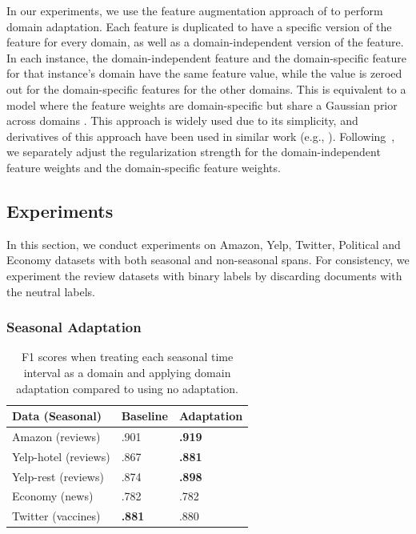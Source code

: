 In our experiments, we use the feature augmentation approach of \cite{daume2007frustratingly} to perform domain adaptation. Each feature is duplicated to have a specific version of the feature for every domain, as well as a domain-independent version of the feature. In each instance, the domain-independent feature and the domain-specific feature for that instance's domain have the same feature value, while the value is zeroed out for the domain-specific features for the other domains. This is equivalent to a model where the feature weights are domain-specific but share a Gaussian prior across domains \cite{finkel2009hierarchical}.
This approach is widely used due to its simplicity, and derivatives of this approach have been used in similar work (e.g., \cite{lynn2017human}).
Following~\cite{finkel2009hierarchical}, we separately adjust the regularization strength for the domain-independent feature weights and the domain-specific feature weights.

\subsection{Experiments}

In this section, we conduct experiments on Amazon, Yelp, Twitter, Political and Economy datasets with both seasonal and non-seasonal spans. 
For consistency, we experiment the review datasets with binary labels by discarding documents with the neutral labels.

\subsubsection{Seasonal Adaptation}

\begin{table}[htp]
\centering
\begin{tabular}{|l|l|l|}
\hline
\bf Data (Seasonal) & \bf Baseline & \bf Adaptation \\
\hline
Amazon (reviews) & .901 & \bf .919 \\
Yelp-hotel (reviews) & .867 & \bf .881 \\
Yelp-rest (reviews) & .874 & \bf .898  \\
Economy (news) & .782 & .782  \\
Twitter (vaccines) & \bf .881 & .880  \\
\hline
\end{tabular}
\caption{\label{chap3:tab:results_seasonal} F1 scores when treating each seasonal time interval as a domain and applying domain adaptation compared to using no adaptation.}
\end{table}

